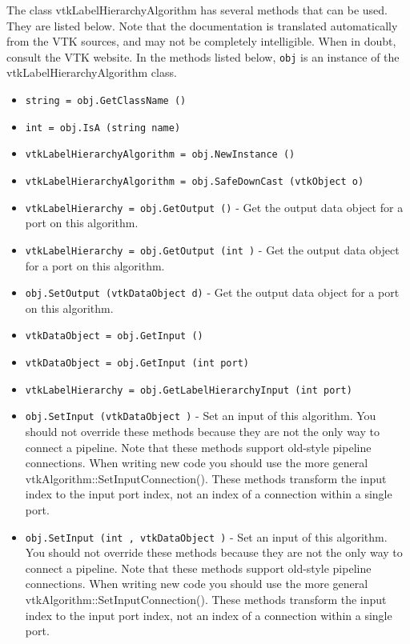 The class vtkLabelHierarchyAlgorithm has several methods that can be used.
  They are listed below.
Note that the documentation is translated automatically from the VTK sources,
and may not be completely intelligible.  When in doubt, consult the VTK website.
In the methods listed below, \verb|obj| is an instance of the vtkLabelHierarchyAlgorithm class.
\begin{itemize}
\item  \verb|string = obj.GetClassName ()|

\item  \verb|int = obj.IsA (string name)|

\item  \verb|vtkLabelHierarchyAlgorithm = obj.NewInstance ()|

\item  \verb|vtkLabelHierarchyAlgorithm = obj.SafeDownCast (vtkObject o)|

\item  \verb|vtkLabelHierarchy = obj.GetOutput ()| -  Get the output data object for a port on this algorithm.

\item  \verb|vtkLabelHierarchy = obj.GetOutput (int )| -  Get the output data object for a port on this algorithm.

\item  \verb|obj.SetOutput (vtkDataObject d)| -  Get the output data object for a port on this algorithm.

\item  \verb|vtkDataObject = obj.GetInput ()|

\item  \verb|vtkDataObject = obj.GetInput (int port)|

\item  \verb|vtkLabelHierarchy = obj.GetLabelHierarchyInput (int port)|

\item  \verb|obj.SetInput (vtkDataObject )| -  Set an input of this algorithm. You should not override these
 methods because they are not the only way to connect a pipeline.
 Note that these methods support old-style pipeline connections.
 When writing new code you should use the more general
 vtkAlgorithm::SetInputConnection().  These methods transform the
 input index to the input port index, not an index of a connection
 within a single port.

\item  \verb|obj.SetInput (int , vtkDataObject )| -  Set an input of this algorithm. You should not override these
 methods because they are not the only way to connect a pipeline.
 Note that these methods support old-style pipeline connections.
 When writing new code you should use the more general
 vtkAlgorithm::SetInputConnection().  These methods transform the
 input index to the input port index, not an index of a connection
 within a single port.


\end{itemize}
